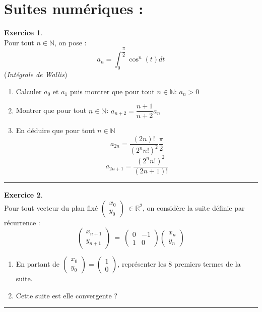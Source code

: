 \documentclass[10pt,a4paper]{article}
\newcommand{\R}{\mathbb{R}}
\newcommand{\N}{\mathbb{N}}
\theoremstyle{definition}
\theoremstyle{definition}
\newtheorem{exo}{Exercice}
\begin{document}
\section*{Suites numériques :}

\begin{minipage}{1.0\linewidth}
\begin{minipage}[t]{0.47\linewidth}
\raggedright
\begin{exo}\quad\\
Pour tout $n\in\N$, on pose : 
$$a_n = \int_{0}^{\dfrac{\pi}{2}}\cos^n(t)dt$$\hfill(\textit{Intégrale de Wallis})
\begin{enumerate}
\item Calculer $a_0$ et $a_1$ puis montrer que pour tout $n\in\N$: $a_n > 0$
\item Montrer que pour tout $n\in\N$: $a_{n+2} = \dfrac{n+1}{n+2}a_n$
\item En déduire que pour tout $n\in\N$
$$a_{2n} = \dfrac{(2n)!}{(2^{n}n!)^2}\dfrac{\pi}{2} $$
$$a_{2n+1} = \dfrac{(2^{n}n!)^2}{(2n+1)!}$$
\end{enumerate}
\centering
\rule{1\linewidth}{0.6pt}
\end{exo}

\begin{exo}\quad\\
Pour tout vecteur du plan fixé $\left(\begin{array}{c}
x_0\\
y_0
\end{array}\right) \ \in\R^2$, on considère la suite définie par récurrence :
$$\left(\begin{array}{c}
x_{n+1}\\
y_{n+1}
\end{array}\right) \ = \ \left(\begin{array}{cc}
0 & -1\\
1 & 0
\end{array}\right) \left(\begin{array}{c}
x_n\\
y_n
\end{array}\right)$$
\begin{enumerate}
\item En partant de $\left(\begin{array}{c}
x_0\\
y_0
\end{array}\right)  =  \left(\begin{array}{c}
1\\
0
\end{array}\right) $, représenter les $8$ premiers termes de la suite.
\item Cette suite est elle convergente ? 
\end{enumerate}
\centering
\rule{1\linewidth}{0.6pt}
\end{exo}


\end{minipage}
\end{minipage}
\end{document}
